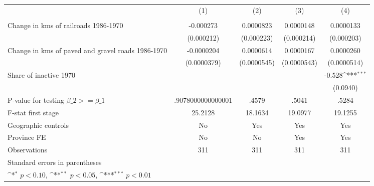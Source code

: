 {
\def\sym#1{\ifmmode^{#1}\else\(^{#1}\)\fi}
\begin{tabular}{l*{4}{c}}
\hline\hline
                &\multicolumn{1}{c}{(1)}&\multicolumn{1}{c}{(2)}&\multicolumn{1}{c}{(3)}&\multicolumn{1}{c}{(4)}\\
                &\multicolumn{1}{c}{}&\multicolumn{1}{c}{}&\multicolumn{1}{c}{}&\multicolumn{1}{c}{}\\
\hline
Change in kms of railroads 1986-1970&-0.000273         &0.0000823         &0.0000148         &0.0000133         \\
                &(0.000212)         &(0.000223)         &(0.000214)         &(0.000203)         \\
[1em]
Change in kms of paved and gravel roads 1986-1970&-0.0000204         &0.0000614         &0.0000167         &0.0000260         \\
                &(0.0000379)         &(0.0000545)         &(0.0000543)         &(0.0000514)         \\
[1em]
Share of inactive 1970&                  &                  &                  &   -0.528\sym{***}\\
                &                  &                  &                  & (0.0940)         \\
\hline
P-value for testing $\beta\_{2} >= \beta\_{1}$&.9078000000000001         &    .4579         &    .5041         &    .5284         \\
F-stat first stage&  25.2128         &  18.1634         &  19.0977         &  19.1255         \\
Geographic controls&       No         &      Yes         &      Yes         &      Yes         \\
Province FE     &       No         &       No         &      Yes         &      Yes         \\
Observations    &      311         &      311         &      311         &      311         \\
\hline\hline
\multicolumn{5}{l}{\footnotesize Standard errors in parentheses}\\
\multicolumn{5}{l}{\footnotesize \sym{*} \(p<0.10\), \sym{**} \(p<0.05\), \sym{***} \(p<0.01\)}\\
\end{tabular}
}
